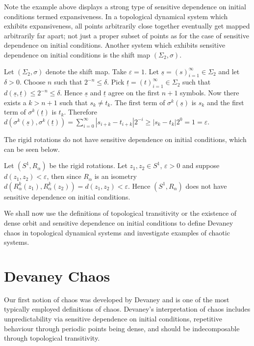Note the example above displays a strong type of sensitive dependence on initial conditions termed expansiveness. In a topological dynamical system which exhibits expansiveness, all points arbitrarily close together eventually get mapped arbitrarily far apart; not just a proper subset of points as for the case of sensitive dependence on initial conditions. Another system which exhibits sensitive dependence on initial conditions is the shift map $(\Sigma_2, \sigma)$.

\begin{exmp} \label{exmp:shift-map-sensitive}
    Let $(\Sigma_2, \sigma)$ denote the shift map. Take $\varepsilon = 1$. Let $\underline{s} = (s)_{i=1}^{\infty} \in \Sigma_2$ and let $\delta > 0$. Choose $n$ such that $2^{-n} \leq \delta$. Pick $\underline{t} = (t)_{i=1}^{\infty} \in \Sigma_2$ such that $d(\underline{s}, \underline{t}) \leq 2^{-n} \leq \delta$. Hence $\underline{s}$ and $\underline{t}$ agree on the first $n+1$ symbols. Now there exists a $k > n + 1$ such that $s_k \neq t_k$. The first term of $\sigma^k(\underline{s})$ is $s_k$ and the first term of $\sigma^k(\underline{t})$ is $t_k$. Therefore $d(\sigma^k(\underline{s}), \sigma^k(\underline{t})) = \sum_{i = 0}^{\infty}|s_{i+k} - t_{i+k}|2^{-i} \geq |s_k - t_k|2^{0} = 1 = \varepsilon$.
\end{exmp}

The rigid rotations do not have sensitive dependence on initial conditions, which can be seen below.

\begin{exmp} \label{exmp:rigid-rotations-not-sensitive}
    Let $(S^1, R_\alpha)$ be the rigid rotations. Let $z_1,z_2 \in S^1$, $\varepsilon > 0$ and suppose $d(z_1, z_2) < \varepsilon$, then since $R_\alpha$ is an isometry $d(R_\alpha^k(z_1), R_\alpha^k(z_2)) = d(z_1, z_2) < \varepsilon$. Hence $(S^1, R_\alpha)$ does not have sensitive dependence on initial conditions.
\end{exmp}

We shall now use the definitions of topological transitivity or the existence of dense orbit and sensitive dependence on initial conditions to define Devaney chaos in topological dynamical systems and investigate examples of chaotic systems.

\section{Devaney Chaos} \label{sec:devaney-chaos}

Our first notion of chaos was developed by Devaney \cite{devaney} and is one of the most typically employed definitions of chaos. Devaney's interpretation of chaos includes unpredictability via sensitive dependence on initial conditions, repetitive behaviour through periodic points being dense, and should be indecomposable through topological transitivity.

